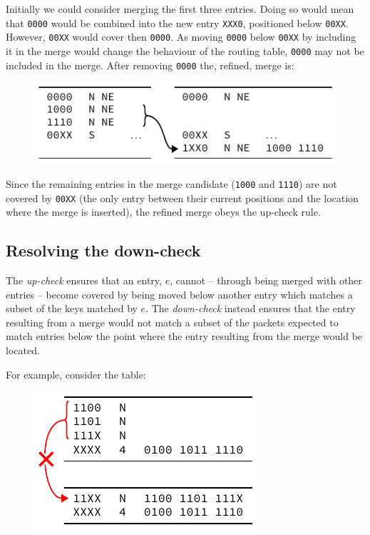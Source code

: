 \documentclass[conference]{IEEEtran}
\newcommand{\mytt}[1]{\texttt{\footnotesize#1}}
\begin{document}
  \noindent Initially we could consider merging the first three entries.
  Doing so would mean that \mytt{0000} would be combined into the new entry \mytt{XXX0}, positioned below \mytt{00XX}.
  However, \mytt{00XX} would cover then \mytt{0000}.
  As moving \mytt{0000} below \mytt{00XX} by including it in the merge would change the behaviour of the routing table, \mytt{0000} may not be included in the merge.
  After removing \mytt{0000} the, refined, merge is:\par\nopagebreak
  \begin{figure}[H]
    \centering
    \includegraphics{figures/upcheck_resolve_example_2}
  \end{figure}

  \noindent Since the remaining entries in the merge candidate (\mytt{1000} and \mytt{1110}) are not covered by \mytt{00XX} (the only entry between their current positions and the location where the merge is inserted), the refined merge obeys the up-check rule.

  \subsection{Resolving the down-check}

  The \textit{up-check} ensures that an entry, $e$, cannot -- through being merged with other entries -- become covered by being moved below another entry which matches a subset of the keys matched by $e$.
  The \textit{down-check} instead ensures that the entry resulting from a merge would not match a subset of the packets expected to match entries below the point where the entry resulting from the merge would be located.
  
  For example, consider the table:\par\nopagebreak
  \begin{figure}[H]
    \centering
    \includegraphics{figures/downcheck_resolve_example_1}
  \end{figure}
\end{document}
